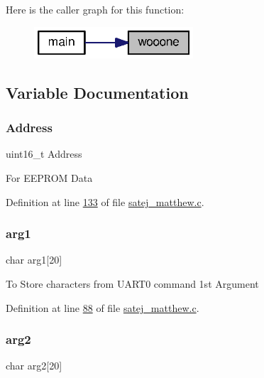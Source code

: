 Here is the caller graph for this function\+:
\nopagebreak
\begin{figure}[H]
\begin{center}
\leavevmode
\includegraphics[width=168pt]{satej__matthew_8c_a35d3aeb4661540f67e367e4e328c6c88_icgraph}
\end{center}
\end{figure}


\subsection{Variable Documentation}
\mbox{\label{satej__matthew_8c_a749532d9fcee171290bbfbe7859e6ba7}} 
\subsubsection{\texorpdfstring{Address}{Address}}
{\footnotesize\ttfamily uint16\+\_\+t Address}

For E\+E\+P\+R\+OM Data 

Definition at line \mbox{\hyperlink{satej__matthew_8c_source_l00133}{133}} of file \mbox{\hyperlink{satej__matthew_8c_source}{satej\+\_\+matthew.\+c}}.

\mbox{\label{satej__matthew_8c_accf689945fb0ed6303f1696f1171a053}} 
\subsubsection{\texorpdfstring{arg1}{arg1}}
{\footnotesize\ttfamily char arg1\mbox{[}20\mbox{]}}

To Store characters from U\+A\+R\+T0 command 1st Argument 

Definition at line \mbox{\hyperlink{satej__matthew_8c_source_l00088}{88}} of file \mbox{\hyperlink{satej__matthew_8c_source}{satej\+\_\+matthew.\+c}}.

\mbox{\label{satej__matthew_8c_a31707e8b8c984ef710bfa2b7f63b0760}} 
\subsubsection{\texorpdfstring{arg2}{arg2}}
{\footnotesize\ttfamily char arg2\mbox{[}20\mbox{]}}

